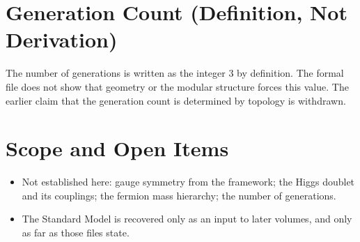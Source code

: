 \documentclass[11pt, a4paper]{article}
\begin{document}
\section{Generation Count (Definition, Not Derivation)}
The number of generations is written as the integer $3$ by definition. The formal file does not show that geometry or the modular structure forces this value. The earlier claim that the generation count is determined by topology is withdrawn.

\section{Scope and Open Items}
\begin{itemize}
  \item Not established here: gauge symmetry from the framework; the Higgs doublet and its couplings; the fermion mass hierarchy; the number of generations.
  \item The Standard Model is recovered only as an input to later volumes, and only as far as those files state.
\end{itemize}
\end{document}
